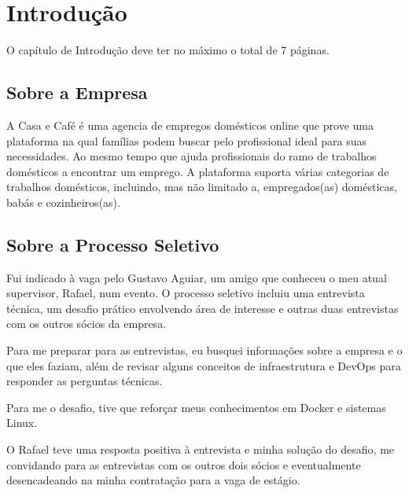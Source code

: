 \chapter{Introdução}\label{chap:intro}

O capítulo de Introdução deve ter no máximo o total de 7 páginas.

\section{Sobre a Empresa}

A Casa e Café é uma agencia de empregos domésticos online que prove uma plataforma na qual famílias podem buscar pelo profissional ideal para suas necessidades. Ao mesmo tempo que ajuda profissionais do ramo de trabalhos domésticos a encontrar um emprego. A plataforma suporta várias categorias de trabalhos domésticos, incluindo, mas não limitado a, empregados(as) domésticas, babás e cozinheiros(as).



\section{Sobre a Processo Seletivo}

Fui indicado à vaga pelo Gustavo Aguiar, um amigo que conheceu o meu atual supervisor, Rafael, num evento. O processo seletivo incluiu uma entrevista técnica, um desafio prático envolvendo área de interesse e outras duas entrevistas com os outros sócios da empresa.

Para me preparar para as entrevistas, eu busquei informações sobre a empresa e o que eles faziam, além de revisar alguns conceitos de infraestrutura e DevOps para responder as perguntas técnicas.

Para me o desafio, tive que reforçar meus conhecimentos em Docker e sistemas Linux.

O Rafael teve uma resposta positiva à entrevista e minha solução do desafio, me convidando para as entrevistas com os outros dois sócios e eventualmente desencadeando na minha contratação para a vaga de estágio.

